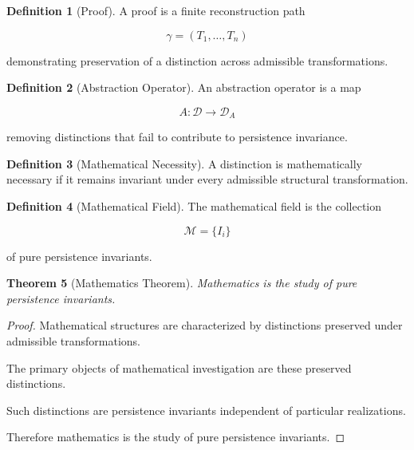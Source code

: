 \documentclass[12pt,oneside]{article}
\newtheorem{theorem}{Theorem}[section] \newtheorem{lemma}[theorem]{Lemma} \newtheorem{proposition}[theorem]{Proposition} \newtheorem{corollary}[theorem]{Corollary}
\theoremstyle{definition}
\newtheorem{definition}[theorem]{Definition} \newtheorem{axiom}[theorem]{Axiom} \newtheorem{remark}[theorem]{Remark} \newtheorem{example}[theorem]{Example}
\begin{document}
\begin{definition}[Proof]

A proof is a finite reconstruction path

\[
\gamma
=
(T_1,\ldots,T_n)
\]

demonstrating preservation of a distinction across admissible transformations.

\end{definition}

\begin{definition}[Abstraction Operator]

An abstraction operator is a map

\[
A :
\mathcal D
\rightarrow
\mathcal D_A
\]

removing distinctions that fail to contribute to persistence invariance.

\end{definition}

\begin{definition}[Mathematical Necessity]

A distinction is mathematically necessary if it remains invariant under every admissible structural transformation.

\end{definition}

\begin{definition}[Mathematical Field]

The mathematical field is the collection

\[
\mathcal M
=
\{I_i\}
\]

of pure persistence invariants.

\end{definition}

\begin{theorem}[Mathematics Theorem]

Mathematics is the study of pure persistence invariants.

\end{theorem}

\begin{proof}

Mathematical structures are characterized by distinctions preserved under admissible transformations.

The primary objects of mathematical investigation are these preserved distinctions.

Such distinctions are persistence invariants independent of particular realizations.

Therefore mathematics is the study of pure persistence invariants.

\end{proof}
\end{document}

